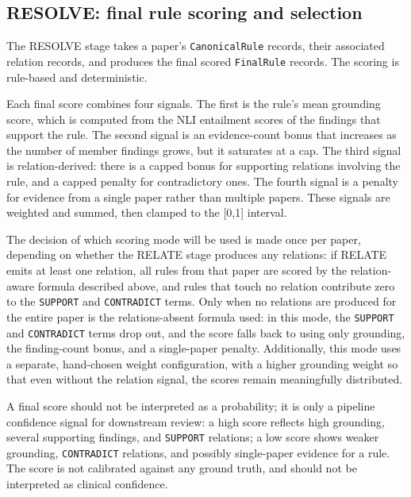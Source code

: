 \subsection{RESOLVE: final rule scoring and selection}\label{subsec:knowledge-resolve}

The RESOLVE stage takes a paper's \texttt{CanonicalRule} records, their associated relation records, and produces the final scored \texttt{FinalRule} records. The scoring is rule-based and deterministic. 

Each final score combines four signals. The first is the rule's mean grounding score, which is computed from the NLI entailment scores of the findings that support the rule. The second signal is an evidence-count bonus that increases as the number of member findings grows, but it saturates at a cap. The third signal is relation-derived: there is a capped bonus for supporting relations involving the rule, and a capped penalty for contradictory ones. The fourth signal is a penalty for evidence from a single paper rather than multiple papers. These signals are weighted and summed, then clamped to the [0,1] interval.

The decision of which scoring mode will be used is made once per paper, depending on whether the RELATE stage produces any relations: if RELATE emits at least one relation, all rules from that paper are scored by the relation-aware formula described above, and rules that touch no relation contribute zero to the \texttt{SUPPORT} and \texttt{CONTRADICT} terms. Only when no relations are produced for the entire paper is the relations-absent formula used: in this mode, the \texttt{SUPPORT} and \texttt{CONTRADICT} terms drop out, and the score falls back to using only grounding, the finding-count bonus, and a single-paper penalty. Additionally, this mode uses a separate, hand-chosen weight configuration, with a higher grounding weight so that even without the relation signal, the scores remain meaningfully distributed.

A final score should not be interpreted as a probability; it is only a pipeline confidence signal for downstream review: a high score reflects high grounding, several supporting findings, and \texttt{SUPPORT} relations; a low score shows weaker grounding, \texttt{CONTRADICT} relations, and possibly single-paper evidence for a rule. The score is not calibrated against any ground truth, and should not be interpreted as clinical confidence. 